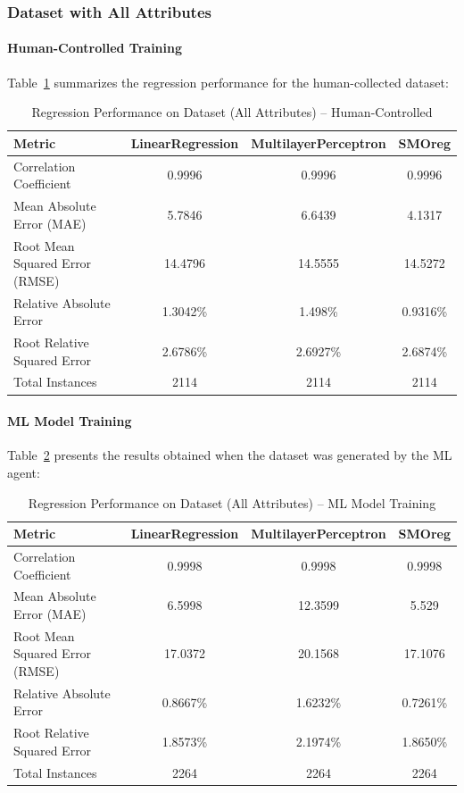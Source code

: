 \documentclass[12pt,a4paper]{article}
\begin{document}
\subsubsection{Dataset with All Attributes}
\paragraph{Human-Controlled Training}
Table~\ref{tab:all_human} summarizes the regression performance for the human-collected dataset:
\begin{table}[ht]
    \caption{Regression Performance on Dataset (All Attributes) -- Human-Controlled}
    \label{tab:all_human}
    \centering
    \begin{tabular}{lccc}
        \toprule
        \textbf{Metric} & \textbf{LinearRegression} & \textbf{MultilayerPerceptron} & \textbf{SMOreg} \\
        \midrule
        Correlation Coefficient & 0.9996 & 0.9996 & 0.9996 \\
        Mean Absolute Error (MAE) & 5.7846 & 6.6439 & 4.1317 \\
        Root Mean Squared Error (RMSE) & 14.4796 & 14.5555 & 14.5272 \\
        Relative Absolute Error & 1.3042\% & 1.498\% & 0.9316\% \\
        Root Relative Squared Error & 2.6786\% & 2.6927\% & 2.6874\% \\
        Total Instances & 2114 & 2114 & 2114 \\
        \bottomrule
    \end{tabular}
\end{table}

\paragraph{ML Model Training}
Table~\ref{tab:all_ml} presents the results obtained when the dataset was generated by the ML agent:
\begin{table}[ht]
    \caption{Regression Performance on Dataset (All Attributes) -- ML Model Training}
    \label{tab:all_ml}
    \centering
    \begin{tabular}{lccc}
        \toprule
        \textbf{Metric} & \textbf{LinearRegression} & \textbf{MultilayerPerceptron} & \textbf{SMOreg} \\
        \midrule
        Correlation Coefficient & 0.9998 & 0.9998 & 0.9998 \\
        Mean Absolute Error (MAE) & 6.5998 & 12.3599 & 5.529 \\
        Root Mean Squared Error (RMSE) & 17.0372 & 20.1568 & 17.1076 \\
        Relative Absolute Error & 0.8667\% & 1.6232\% & 0.7261\% \\
        Root Relative Squared Error & 1.8573\% & 2.1974\% & 1.8650\% \\
        Total Instances & 2264 & 2264 & 2264 \\
        \bottomrule
    \end{tabular}
\end{table}
\end{document}
